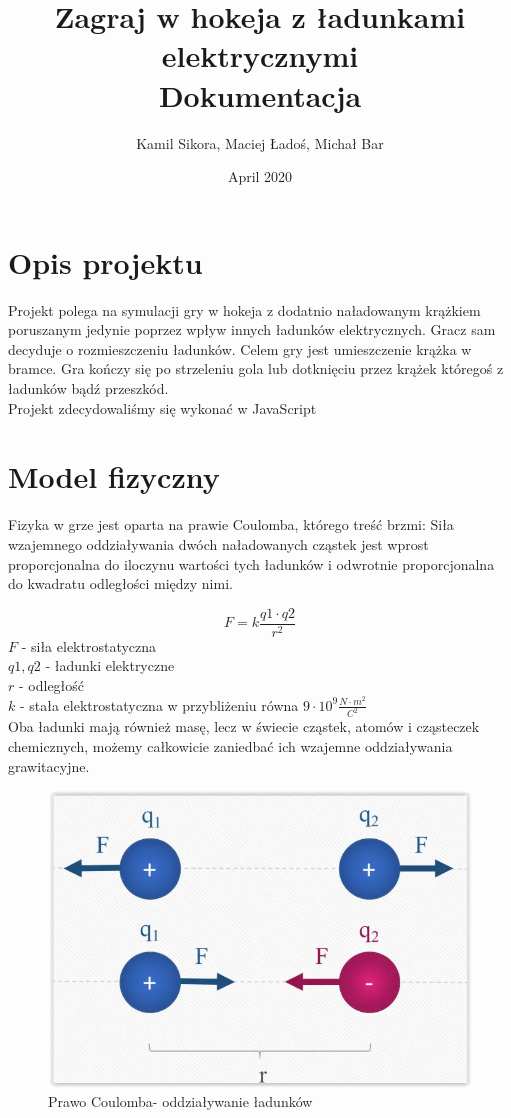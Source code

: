 \documentclass{article}
\title{ Zagraj w hokeja z ładunkami elektrycznymi \\
\large Dokumentacja}
\author{Kamil Sikora,
Maciej Ładoś,
Michał Bar}
\date{April 2020}
\begin{document}
\maketitle

\newpage
\tableofcontents

\newpage

\section{Opis projektu}
Projekt polega na symulacji gry w hokeja z dodatnio naładowanym krążkiem poruszanym jedynie poprzez wpływ innych ładunków elektrycznych. Gracz sam decyduje o rozmieszczeniu ładunków. Celem gry jest umieszczenie krążka w bramce. Gra kończy się po strzeleniu gola lub dotknięciu przez krążek któregoś z ładunków bądź przeszkód.\\
Projekt zdecydowaliśmy się wykonać w JavaScript

\section{Model fizyczny}
Fizyka w grze jest oparta na prawie Coulomba, którego treść brzmi: Siła wzajemnego oddziaływania dwóch naładowanych cząstek jest wprost proporcjonalna do iloczynu wartości tych ładunków i odwrotnie proporcjonalna do kwadratu odległości między nimi.

$$F=k \frac{q 1 \cdot q 2}{r^{2}}$$
$F$ - siła elektrostatyczna \\
$q1, q2$ - ładunki elektryczne \\
$r$ - odległość \\
$k$ - stała elektrostatyczna w przybliżeniu równa $9 \cdot 10^9 \frac{N \cdot m^2}{C^2}$
\\

\noindent Oba ładunki mają również masę, lecz w świecie cząstek, atomów i cząsteczek chemicznych, możemy całkowicie zaniedbać ich wzajemne oddziaływania grawitacyjne.


\begin{figure}[h]
    \centering
    \includegraphics[scale=0.5]{img/Prawo_Coulomba.PNG}

    \caption{Prawo Coulomba- oddziaływanie ładunków}
    \label{fig:Prawo_Coulomba}
\end{figure}
\end{document}
